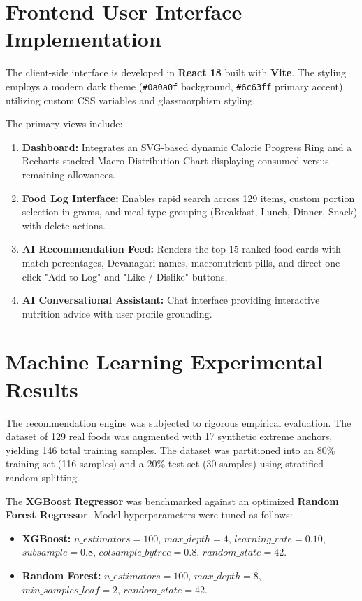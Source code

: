 \documentclass[12pt,a4paper]{report}
\begin{document}
\section{Frontend User Interface Implementation}

The client-side interface is developed in \textbf{React 18} built with \textbf{Vite}. The styling employs a modern dark theme (\texttt{\#0a0a0f} background, \texttt{\#6c63ff} primary accent) utilizing custom CSS variables and glassmorphism styling.

The primary views include:
\begin{enumerate}[leftmargin=*]
  \item \textbf{Dashboard:} Integrates an SVG-based dynamic Calorie Progress Ring and a Recharts stacked Macro Distribution Chart displaying consumed versus remaining allowances.
  \item \textbf{Food Log Interface:} Enables rapid search across 129 items, custom portion selection in grams, and meal-type grouping (Breakfast, Lunch, Dinner, Snack) with delete actions.
  \item \textbf{AI Recommendation Feed:} Renders the top-15 ranked food cards with match percentages, Devanagari names, macronutrient pills, and direct one-click "Add to Log" and "Like / Dislike" buttons.
  \item \textbf{AI Conversational Assistant:} Chat interface providing interactive nutrition advice with user profile grounding.
\end{enumerate}

\section{Machine Learning Experimental Results}

The recommendation engine was subjected to rigorous empirical evaluation. The dataset of 129 real foods was augmented with 17 synthetic extreme anchors, yielding 146 total training samples. The dataset was partitioned into an 80\% training set (116 samples) and a 20\% test set (30 samples) using stratified random splitting.

The \textbf{XGBoost Regressor} was benchmarked against an optimized \textbf{Random Forest Regressor}. Model hyperparameters were tuned as follows:
\begin{itemize}
  \item \textbf{XGBoost:} $n\_estimators=100$, $max\_depth=4$, $learning\_rate=0.10$, $subsample=0.8$, $colsample\_bytree=0.8$, $random\_state=42$.
  \item \textbf{Random Forest:} $n\_estimators=100$, $max\_depth=8$, $min\_samples\_leaf=2$, $random\_state=42$.
\end{itemize}
\end{document}
